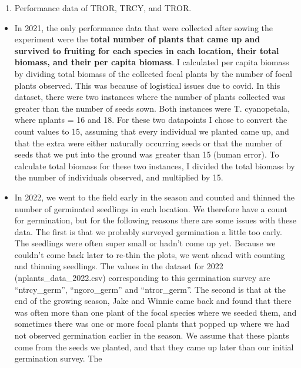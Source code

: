 \documentclass[
]{article}
\providecommand{\tightlist}{%
  \setlength{\itemsep}{0pt}\setlength{\parskip}{0pt}}
\begin{document}
\begin{enumerate}
\def\labelenumi{(\arabic{enumi})}
\setcounter{enumi}{2}
\tightlist
\item
  Performance data of TROR, TRCY, and TROR.
\end{enumerate}

\begin{itemize}
\item
  In 2021, the only performance data that were collected after sowing
  the experiment were the \textbf{total number of plants that came up
  and survived to fruiting for each species in each location, their
  total biomass, and their per capita biomass}. I calculated per capita
  biomass by dividing total biomass of the collected focal plants by the
  number of focal plants observed. This was because of logistical issues
  due to covid. In this dataset, there were two instances where the
  number of plants collected was greater than the number of seeds sown.
  Both instances were T. cyanopetala, where nplants = 16 and 18. For
  these two datapoints I chose to convert the count values to 15,
  assuming that every individual we planted came up, and that the extra
  were either naturally occurring seeds or that the number of seeds that
  we put into the ground was greater than 15 (human error). To calculate
  total biomass for these two instances, I divided the total biomass by
  the number of individuals observed, and multiplied by 15.
\item
  In 2022, we went to the field early in the season and counted and
  thinned the number of germinated seedlings in each location. We
  therefore have a count for germination, but for the following reasons
  there are some issues with these data. The first is that we probably
  surveyed germination a little too early. The seedlings were often
  super small or hadn't come up yet. Because we couldn't come back later
  to re-thin the plots, we went ahead with counting and thinning
  seedlings. The values in the dataset for 2022
  (nplants\_data\_2022.csv) corresponding to this germination survey are
  ``ntrcy\_germ'', ``ngoro\_germ'' and ``ntror\_germ''. The second is
  that at the end of the growing season, Jake and Winnie came back and
  found that there was often more than one plant of the focal species
  where we seeded them, and sometimes there was one or more focal plants
  that popped up where we had not observed germination earlier in the
  season. We assume that these plants come from the seeds we planted,
  and that they came up later than our initial germination survey. The

\end{itemize}
\end{document}
